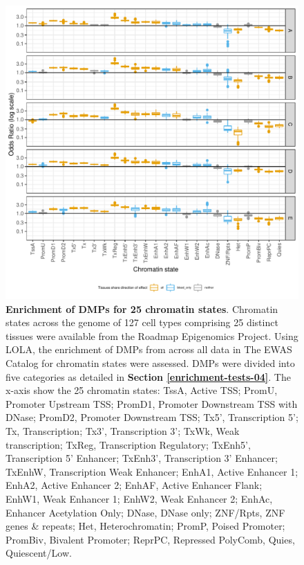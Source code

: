 \documentclass[11pt,twoside]{bristolthesis}
\begin{document}
\begin{figure}[!htp]

{\centering \includegraphics[width=1\linewidth]{figure/04-properties_of_ewas/chromatin_states_enrichment_boxplots_onepage} 

}

\caption[Enrichment of DMPs for 25 chromatin states]{\textbf{Enrichment of DMPs for 25 chromatin states}. Chromatin states across the genome of 127 cell types comprising 25 distinct tissues were available from the Roadmap Epigenomics Project. Using LOLA, the enrichment of DMPs from across all data in The EWAS Catalog for chromatin states were assessed. DMPs were divided into five categories as detailed in \textbf{Section \ref{enrichment-tests-04}}. The x-axis show the 25 chromatin states: TssA, Active TSS; PromU, Promoter Upstream TSS; PromD1, Promoter Downstream TSS with DNase; PromD2, Promoter Downstream TSS; Tx5', Transcription 5'; Tx, Transcription; Tx3', Transcription 3'; TxWk, Weak transcription; TxReg, Transcription Regulatory; TxEnh5', Transcription 5' Enhancer; TxEnh3', Transcription 3' Enhancer; TxEnhW, Transcription Weak Enhancer; EnhA1, Active Enhancer 1; EnhA2, Active Enhancer 2; EnhAF, Active Enhancer Flank; EnhW1, Weak Enhancer 1; EnhW2, Weak Enhancer 2; EnhAc, Enhancer Acetylation Only; DNase, DNase only; ZNF/Rpts, ZNF genes \& repeats; Het, Heterochromatin; PromP, Poised Promoter; PromBiv, Bivalent Promoter; ReprPC, Repressed PolyComb, Quies, Quiescent/Low.}\label{fig:chrom-state-plot}
\end{figure}
\end{document}

